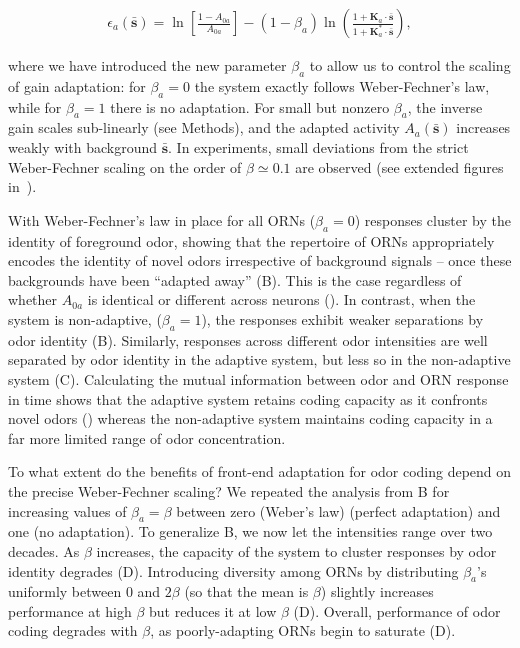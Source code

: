 \documentclass[9pt,lineno]{elife}
\begin{document}
\begin{align}
\epsilon_{a}(\bar{\mathbf s}) = \ln\left[\frac{1-A_{0a}}{A_{0a}}\right] - \left(1-\beta_a\right)\ln\left(\frac{1 + \mathbf{K}_a\cdot\bar{\mathbf{s}}}{1 + \mathbf{K}^*_a\cdot\bar{\mathbf{s}}}\right),
\label{eq:beta}
\end{align}

where we have introduced the new parameter $\beta_a$ to allow us to control the scaling of gain adaptation: for $\beta_a=0$ the system exactly follows Weber-Fechner's law, while for $\beta_a=1$ there is no adaptation. For small but nonzero $\beta_a$, the inverse gain scales sub-linearly (see Methods), and the adapted activity $A_a(\bar{\mathbf s})$ increases weakly with background $\bar{\mathbf s}$. In experiments, small deviations from the strict Weber-Fechner scaling on the order of $\beta\simeq 0.1$ are observed (see extended figures in~\citep{srinivas_elife}).



With Weber-Fechner's law in place for all ORNs ($\beta_a=0$) responses cluster by the identity of foreground odor, showing that the repertoire of ORNs appropriately encodes the identity of novel odors irrespective of background signals -- once these backgrounds have been ``adapted away'' (B). This is the case regardless of whether $A_{0a}$ is identical or different across neurons (). In contrast, when the system is non-adaptive, ($\beta_a=1$), the responses exhibit weaker separations by odor identity (B). Similarly, responses across different odor intensities are well separated by odor identity in the adaptive system, but less so in the non-adaptive system (C). Calculating the mutual information between odor and ORN response in time shows that the adaptive system retains coding capacity as it confronts novel odors () whereas the non-adaptive system maintains coding capacity in a far more limited range of odor concentration.



To what extent do the benefits of front-end adaptation for odor coding depend on the precise Weber-Fechner scaling? We repeated the analysis from B for increasing values of $\beta_a=\beta$ between zero (Weber's law) (perfect adaptation) and one (no adaptation). To generalize B, we now let the intensities range over two decades.  As $\beta$ increases, the capacity of the system to cluster responses by odor identity degrades (D). Introducing diversity among ORNs by distributing $\beta_a$'s uniformly between 0 and $2\beta$ (so that the mean is $\beta$) slightly increases performance at high $\beta$ but reduces it at low $\beta$ (D). Overall, performance of odor coding degrades with $\beta$, as poorly-adapting ORNs begin to saturate (D). 
\end{document}
